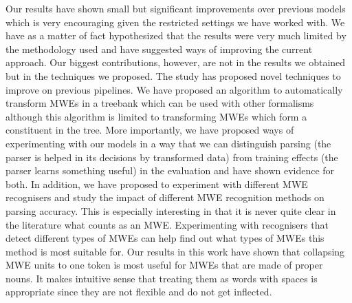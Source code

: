 \documentclass[output=paper]{LSP/langsci}
\begin{document}
\indent Our results have shown small but significant improvements over previous models which is very encouraging given the restricted settings we have worked with. We have as a matter of fact hypothesized that the results were very much limited by the methodology used and have suggested ways of improving the current approach. Our biggest contributions, however, are not in the results we obtained but in the techniques we proposed. The study has proposed novel techniques to improve on previous pipelines. We have proposed an algorithm to automatically transform MWEs in a treebank which can be used with other formalisms although this algorithm is limited to transforming MWEs which form a constituent in the tree. More importantly, we have proposed ways of experimenting with our models in a way that we can distinguish parsing (the parser is helped in its decisions by transformed data) from training effects (the parser learns something useful) in the evaluation and have shown evidence for both. In addition, we have proposed to experiment with different MWE recognisers and study the impact of different MWE recognition methods on parsing accuracy. This is especially interesting in that it is never quite clear in the literature what counts as an MWE. Experimenting with recognisers that detect different types of MWEs can help find out what types of MWEs this method is most suitable for. Our results in this work have shown that collapsing MWE units to one token is most useful for MWEs that are made of proper nouns. It makes intuitive sense that treating them as words with spaces is appropriate since they are not flexible and do not get inflected.
\end{document}

